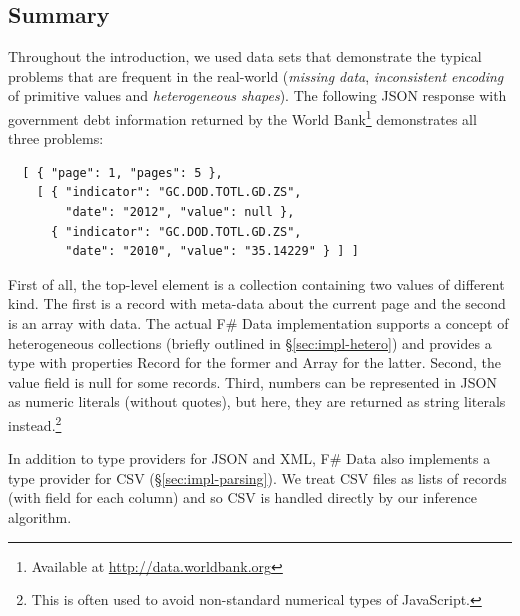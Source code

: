 \documentclass[10pt,preprint,blind,clearpagebib]{sigplanconf}
\newcommand{\kvd}[1]{\textnormal{\textcolor{kvdclr}{\sffamily #1}}}
\newcommand{\ident}[1]{\textnormal{\sffamily #1}}
\begin{document}
\subsection{Summary}
\label{sec:providers-sum}
Throughout the introduction, we used data sets that demonstrate the typical problems that are frequent
in the real-world (\emph{missing data}, \emph{inconsistent encoding} of primitive values and 
\emph{heterogeneous shapes}). The following 
JSON response with government debt information returned by the World Bank\footnote{Available at 
\url{http://data.worldbank.org}} demonstrates all three problems:
%
{\small{
\begin{verbatim}
  [ { "page": 1, "pages": 5 },
    [ { "indicator": "GC.DOD.TOTL.GD.ZS",
        "date": "2012", "value": null },
      { "indicator": "GC.DOD.TOTL.GD.ZS",
        "date": "2010", "value": "35.14229" } ] ]
\end{verbatim}
}}
%
\noindent
First of all, the top-level element is a collection containing two values of different kind.
The first is a record with meta-data about the current page and the second is an array with data. 
The actual F\# Data implementation supports a concept of heterogeneous collections (briefly outlined
in \S\ref{sec:impl-hetero}) and provides a type with properties \ident{Record} for the former and 
\ident{Array} for the latter. Second, the \ident{value} field is \kvd{null} for some records. Third, 
numbers can be represented in JSON as numeric literals (without quotes), but here, they are 
returned as string literals instead.\footnote{This is often used to avoid non-standard numerical 
types of JavaScript.}

In addition to type providers for JSON and XML, F\# Data also implements a type provider for CSV 
(\S\ref{sec:impl-parsing}). We treat CSV files as lists of records (with field for each column) 
and so CSV is handled directly by our inference algorithm.


%
%
\end{document}
